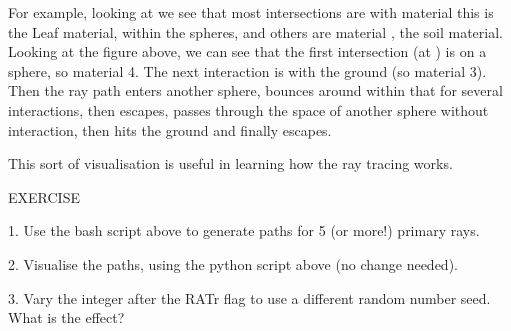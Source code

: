 \documentclass[letterpaper,10pt,english]{sphinxmanual}
\begin{document}
For example, looking at  we see that most intersections are with material  \textendash{} this is the Leaf material, within the spheres, and others are material , the soil material. Looking at the figure above, we can see that the first intersection (at ) is on a sphere, so material 4. The next interaction is with the ground (so material 3). Then the ray path enters another sphere, bounces around within that for several interactions, then
escapes, passes through the space of another sphere without interaction, then hits the ground and finally escapes.

This sort of visualisation is useful in learning how the ray tracing works.

\begin{sphinxVerbatim}[commandchars=\\\{\}]
EXERCISE

1. Use the bash script above to generate paths for 5 (or more!) primary rays.

2. Visualise the paths, using the python script above (no change needed).

3. Vary the integer after the \PYGZhy{}RATr flag to use a different random number seed. What is the effect?
\end{sphinxVerbatim}

\end{document}
